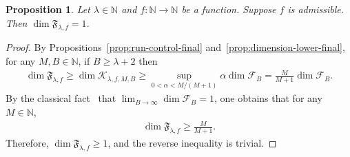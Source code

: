 \documentclass[10pt,a4paper]{amsart}
\newtheorem{prop}{Proposition}
\begin{document}
\begin{prop}
\label{prop:eventual-full-dimension}
Let $\lambda\in\mathbb N$ and $f:\mathbb{N}\to\mathbb{N}$ be a function. Suppose $f$ is admissible. Then $\dim{\mathfrak{F}_{\lambda,f}}=1$.
\end{prop}
\begin{proof}
By Propositions~\ref{prop:run-control-final} and~\ref{prop:dimension-lower-final}, for any $M,B\in\mathbb{N}$, if $B\geq \lambda+2$ then
\begin{align*}
    \dim{\mathfrak{F}_{\lambda,f}}
    \geq \dim{\mathcal{K}_{\lambda,f,M,B}}
    \geq\sup_{0<\alpha<M/(M+1)}\alpha\dim{\mathcal{F}_B}
    =\frac{M}{M+1}\dim{\mathcal{F}_B}.
\end{align*}
By the classical fact~\cite{hensley1992continued,jarnik1928metrischen} that $\lim_{B\to\infty}\dim{\mathcal{F}_B}=1$, one obtains that for any $M\in\mathbb{N}$,
\begin{align*}
    \dim{\mathfrak{F}_{\lambda,f}}\geq\frac{M}{M+1}.
\end{align*}
Therefore, $\dim{\mathfrak{F}_{\lambda,f}}\geq1$, and the reverse inequality is trivial.
\end{proof}
\end{document}
